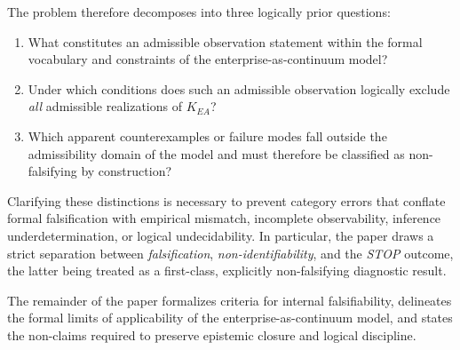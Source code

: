 \medskip

The problem therefore decomposes into three logically prior questions:

\begin{enumerate}
  \item What constitutes an admissible observation statement within the
        formal vocabulary and constraints of the enterprise-as-continuum
        model?
  \item Under which conditions does such an admissible observation
        logically exclude \emph{all} admissible realizations of
        \(K_{EA}\)?
  \item Which apparent counterexamples or failure modes fall outside the
        admissibility domain of the model and must therefore be
        classified as non-falsifying by construction?
\end{enumerate}

\medskip

Clarifying these distinctions is necessary to prevent category errors
that conflate formal falsification with empirical mismatch, incomplete
observability, inference underdetermination, or logical undecidability.
In particular, the paper draws a strict separation between
\emph{falsification}, \emph{non-identifiability}, and the \emph{STOP}
outcome, the latter being treated as a first-class, explicitly
non-falsifying diagnostic result.

\medskip

The remainder of the paper formalizes criteria for internal
falsifiability, delineates the formal limits of applicability of the
enterprise-as-continuum model, and states the non-claims required to
preserve epistemic closure and logical discipline.
